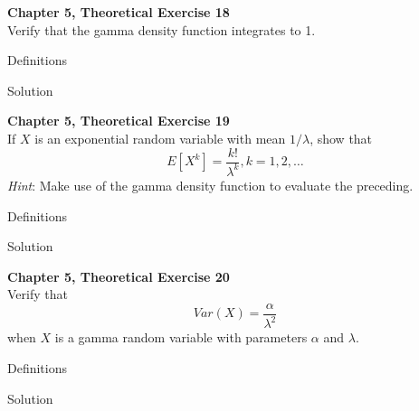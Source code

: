 \documentclass{article}
\begin{document}
\begin{spacing}{1.1}
\maketitle

\newpage
\begin{homeworkProblem}
  {\bf Chapter 5, Theoretical Exercise 18}\\
  Verify that the gamma density function integrates to 1.
  
  \begin{homeworkSection}{Definitions}
    
    
  \end{homeworkSection}
  \begin{homeworkSection}{Solution}
    
  \end{homeworkSection}
\end{homeworkProblem}

\newpage
\begin{homeworkProblem}
  {\bf Chapter 5, Theoretical Exercise 19}\\
  If $X$ is an exponential random variable with mean $1/\lambda$, show that
  \[E[ X^k] = \frac{ k!}{ \lambda^k}, k = 1, 2, \dots\]
  \emph{Hint}: Make use of the gamma density function to evaluate the preceding.
  \begin{homeworkSection}{Definitions}
    
    
  \end{homeworkSection}
  \begin{homeworkSection}{Solution}
    
  \end{homeworkSection}
\end{homeworkProblem}

\newpage
\begin{homeworkProblem}
  {\bf Chapter 5, Theoretical Exercise 20}\\
  Verify that
  \[Var( X) = \frac{ \alpha}{ \lambda^2}\]
  when $X$ is a gamma random variable with parameters $\alpha$ and $\lambda$.
  \begin{homeworkSection}{Definitions}
    
    
  \end{homeworkSection}
  \begin{homeworkSection}{Solution}
    

\end{homeworkSection}
\end{homeworkProblem}
\end{spacing}
\end{document}
